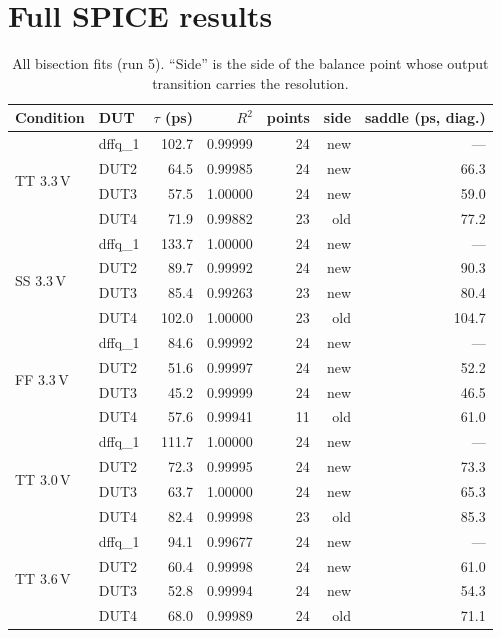 \documentclass[11pt]{article}
\begin{document}
\section{Full SPICE results}
\begin{table}[H]
\centering\footnotesize
\begin{tabular}{@{}llrrrrr@{}}
\toprule
Condition & DUT & $\tau$ (ps) & $R^2$ & points & side & saddle (ps, diag.) \\
\midrule
\multirow{4}{*}{TT 3.3\,V} & dffq\_1 & 102.7 & 0.99999 & 24 & new & --- \\
& DUT2 & 64.5 & 0.99985 & 24 & new & 66.3 \\
& DUT3 & 57.5 & 1.00000 & 24 & new & 59.0 \\
& DUT4 & 71.9 & 0.99882 & 23 & old & 77.2 \\
\midrule
\multirow{4}{*}{SS 3.3\,V} & dffq\_1 & 133.7 & 1.00000 & 24 & new & --- \\
& DUT2 & 89.7 & 0.99992 & 24 & new & 90.3 \\
& DUT3 & 85.4 & 0.99263 & 23 & new & 80.4 \\
& DUT4 & 102.0 & 1.00000 & 23 & old & 104.7 \\
\midrule
\multirow{4}{*}{FF 3.3\,V} & dffq\_1 & 84.6 & 0.99992 & 24 & new & --- \\
& DUT2 & 51.6 & 0.99997 & 24 & new & 52.2 \\
& DUT3 & 45.2 & 0.99999 & 24 & new & 46.5 \\
& DUT4 & 57.6 & 0.99941 & 11 & old & 61.0 \\
\midrule
\multirow{4}{*}{TT 3.0\,V} & dffq\_1 & 111.7 & 1.00000 & 24 & new & --- \\
& DUT2 & 72.3 & 0.99995 & 24 & new & 73.3 \\
& DUT3 & 63.7 & 1.00000 & 24 & new & 65.3 \\
& DUT4 & 82.4 & 0.99998 & 23 & old & 85.3 \\
\midrule
\multirow{4}{*}{TT 3.6\,V} & dffq\_1 & 94.1 & 0.99677 & 24 & new & --- \\
& DUT2 & 60.4 & 0.99998 & 24 & new & 61.0 \\
& DUT3 & 52.8 & 0.99994 & 24 & new & 54.3 \\
& DUT4 & 68.0 & 0.99989 & 24 & old & 71.1 \\
\bottomrule
\end{tabular}
\caption{All bisection fits (run 5). ``Side'' is the side of the balance point whose output transition carries the
resolution.}
\end{table}
\end{document}
